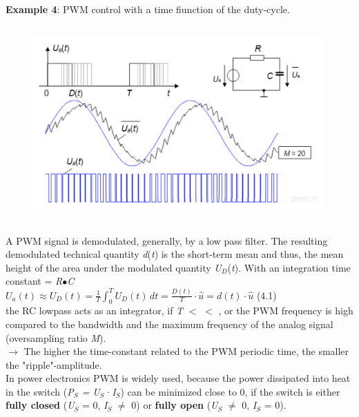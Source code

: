 \textbf{ Example 4}:  PWM control with a time fiunction of the duty-cycle.

    \begin{figure}[h]
    \centering
    \includegraphics[width=14cm, height=7.5cm]{Images/image170.png}
    \label{fig:Fig 124}
    \end{figure}

A PWM signal is demodulated, generally, by a low pass filter. The resulting demodulated technical quantity \textit{d}(\textit{t}) is the short-term mean and thus, the mean height of the area under the modulated quantity \textit{U${}_{D}$}(\textit{t}). With an integration time constant  = \textit{R$\bullet$C} \\

 $U_{a} (t)\approx U_{D} (t)=\frac{1}{T} \int _{0}^{T}U_{D} (t)\, dt =\frac{D(t)}{T} \cdot \hat{u}=d(t)\cdot \hat{u}$  (4.1) \\

the RC lowpass acts as an integrator, if \textit{T} $\mathrm{<}$ $\mathrm{<}$ , or the PWM frequency is high compared to the bandwidth and the maximum frequency of the analog signal (oversampling ratio \textit{M}). \\

$\rightarrow$ The higher the time-constant related to the PWM periodic time, the smaller the "ripple"-amplitude.\\

In power electronics PWM is widely used, because the power dissipated into heat in the switch (\textit{P${}_{S}$ = U${}_{S}$}·\textit{I${}_{S}$}) can be minimized close to 0, if the switch is either \textbf{fully closed} (\textit{U${}_{S}$} = 0, \textit{I${}_{S}$} $\mathrm{\neq}$ 0) or \textbf{fully open} (\textit{U${}_{S}$} $\mathrm{\neq}$ 0, \textit{I${}_{S}$}  = 0).

